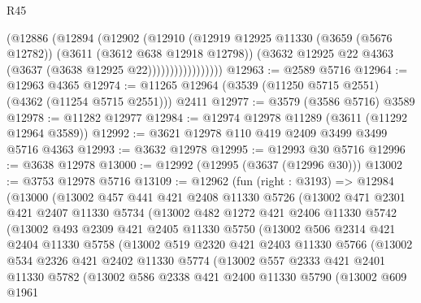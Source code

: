 \begin{lexlean}{R45}
\begin{coremodule}
                      (@12886
                        (@12894
                          (@12902
                            (@12910
                              (@12919
                                @12925
                                @11330
                                (@3659 (@5676 @12782))
                                (@3611 (@3612 @638 @12918 @12798))
                                (@3632 @12925 @22 @4363 (@3637 (@3638 @12925 @22)))))))))))))))))
@12963 := @2589 @5716
@12964 := @12963 @4365
@12974 := @11265 @12964 (@3539 (@11250 @5715 @2551) (@4362 (@11254 @5715 @2551))) @2411
@12977 := @3579 (@3586 @5716) @3589
@12978 := @11282 @12977
@12984 := @12974 @12978 @11289 (@3611 (@11292 @12964 @3589))
@12992 := @3621 @12978 @110 @419 @2409 @3499 @3499 @5716 @4363
@12993 := @3632 @12978
@12995 := @12993 @30 @5716
@12996 := @3638 @12978
@13000 := @12992 (@12995 (@3637 (@12996 @30)))
@13002 := @3753 @12978 @5716
@13109 := @12962
    (fun (right : @3193) =>
    @12984
      (@13000
        (@13002
          @457
          @441
          @421
          @2408
          @11330
          @5726
          (@13002
            @471
            @2301
            @421
            @2407
            @11330
            @5734
            (@13002
              @482
              @1272
              @421
              @2406
              @11330
              @5742
              (@13002
                @493
                @2309
                @421
                @2405
                @11330
                @5750
                (@13002
                  @506
                  @2314
                  @421
                  @2404
                  @11330
                  @5758
                  (@13002
                    @519
                    @2320
                    @421
                    @2403
                    @11330
                    @5766
                    (@13002
                      @534
                      @2326
                      @421
                      @2402
                      @11330
                      @5774
                      (@13002
                        @557
                        @2333
                        @421
                        @2401
                        @11330
                        @5782
                        (@13002
                          @586
                          @2338
                          @421
                          @2400
                          @11330
                          @5790
                          (@13002
                            @609
                            @1961

\end{coremodule}
\end{lexlean}
